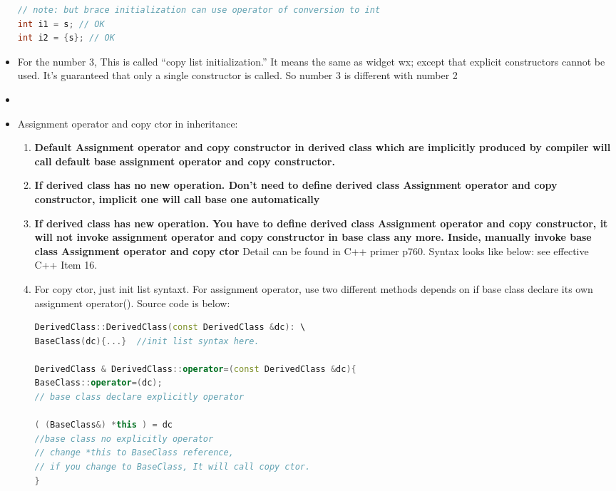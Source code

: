 \documentclass[a4paper,12pt,twoside]{book}
\begin{document}
\begin{itemize}
\begin{lstlisting}[frame=single, language=c++]
// note: but brace initialization can use operator of conversion to int
int i1 = s; // OK
int i2 = {s}; // OK
\end{lstlisting}



\item For the number 3, This is called “copy list initialization.” It means the same as widget w{x}; except that explicit constructors cannot be used. It’s guaranteed that only a single constructor is called. So number 3 is different with number 2

\item 



\item Assignment operator and copy ctor in inheritance:
\begin{enumerate}
\item \textbf{Default Assignment  operator and  copy constructor in derived class which are implicitly produced by compiler will call default base assignment  operator and  copy constructor.}

\item \textbf{If derived class has no new operation. Don't need to define derived class Assignment  operator and  copy constructor, implicit one will call base one automatically}

\item \textbf{If derived class has new operation. You have to define derived class Assignment  operator and  copy constructor, it will not invoke assignment  operator and  copy constructor in base class any more.  Inside, manually invoke base class Assignment operator and copy ctor } Detail can be found in C++ primer p760. Syntax looks like below: see effective C++ Item 16.

\item For copy ctor, just init list syntaxt. For assignment operator, use two different methods depends on if base class declare its own assignment operator(). Source code is below:

\begin{lstlisting}[frame=single, language=c++]
DerivedClass::DerivedClass(const DerivedClass &dc): \
BaseClass(dc){...}  //init list syntax here.

DerivedClass & DerivedClass::operator=(const DerivedClass &dc){
BaseClass::operator=(dc);
// base class declare explicitly operator

( (BaseClass&) *this ) = dc
//base class no explicitly operator
// change *this to BaseClass reference,
// if you change to BaseClass, It will call copy ctor.
}
\end{lstlisting}

\end{enumerate}
\end{itemize}
\end{document}
